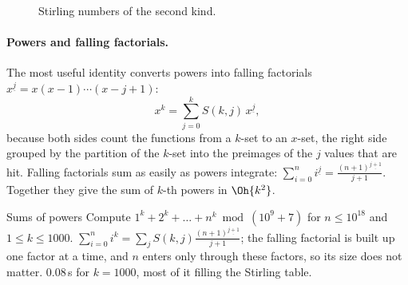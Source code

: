 \begin{figure}[htbp]
\centering
{}
\caption{Stirling numbers of the second kind.}
\label{fig:stirling}
\end{figure}


\paragraph{Powers and falling factorials.} The most useful identity converts powers into falling factorials $x^{\underline{j}} = x (x-1)
\cdots (x - j + 1)$:
\[
  x^k = \sum_{j=0}^{k} S(k, j)\, x^{\underline{j}} ,
\]
because both sides count the functions from a $k$-set to an $x$-set, the right side grouped by the partition of the $k$-set into
the preimages of the $j$ values that are hit. Falling factorials sum as easily as powers integrate: $\sum_{i=0}^{n} i^{\underline{j}} =
\frac{(n+1)^{\underline{j+1}}}{j + 1}$. Together they give the sum of $k$-th powers in $\Oh{k^2}$.

\begin{problem}{Sums of powers}
Compute $1^k + 2^k + \dots + n^k \bmod (10^9 + 7)$ for $n \le 10^{18}$ and $1 \le k \le 1000$.
\solution $\sum_{i=0}^{n} i^k = \sum_{j} S(k, j) \frac{(n+1)^{\underline{j+1}}}{j+1}$; the falling factorial is built up one factor at
a time, and $n$ enters only through these factors, so its size does not matter. 0.08\,s for $k = 1000$, most of it filling the
Stirling table.
\end{problem}

